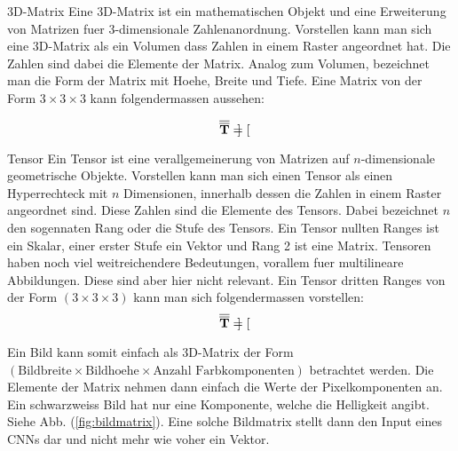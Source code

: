 \documentclass[../main]{subfiles}
\begin{document}
\begin{defbox}{3D-Matrix}
  Eine 3D-Matrix ist ein mathematischen Objekt und eine Erweiterung von Matrizen
  fuer 3-dimensionale Zahlenanordnung. Vorstellen kann man sich eine 3D-Matrix
  als ein Volumen dass Zahlen in einem Raster angeordnet hat.
  Die Zahlen sind dabei die Elemente der Matrix. Analog zum Volumen, bezeichnet
  man die Form der Matrix mit Hoehe, Breite und Tiefe.
  Eine Matrix von der Form $3 \times 3 \times 3$ kann folgendermassen aussehen:

  \begin{equation*}
    \overline{\overline{\mathbf{T}}} = \begin{bmatrix}

    \end{bmatrix}
  \end{equation*}

\end{defbox}

\begin{defbox}{Tensor}
  Ein Tensor ist eine verallgemeinerung von Matrizen auf
  $n$-dimensionale geometrische Objekte. Vorstellen kann man sich einen Tensor
  als einen Hyperrechteck mit $n$ Dimensionen, innerhalb dessen die Zahlen in
  einem Raster angeordnet sind. Diese Zahlen sind die Elemente des Tensors.
  Dabei bezeichnet $n$ den sogennaten Rang oder die Stufe des Tensors.
  Ein Tensor nullten Ranges ist ein Skalar, einer erster Stufe ein Vektor und
  Rang 2 ist eine Matrix.
  Tensoren haben noch viel weitreichendere Bedeutungen, vorallem fuer
  multilineare Abbildungen. Diese sind aber hier nicht relevant.
  \para
  Ein Tensor dritten Ranges von der Form $(3 \times 3 \times 3)$ kann man sich
  folgendermassen vorstellen:
  \begin{equation*}
    \overline{\overline{\mathbf{T}}} = \begin{bmatrix}

    \end{bmatrix}
  \end{equation*}

\end{defbox}
\para
Ein Bild kann somit einfach als 3D-Matrix der Form $(\text{Bildbreite} \times
\text{Bildhoehe} \times \text{Anzahl Farbkomponenten})$ betrachtet werden. Die
Elemente der Matrix nehmen dann einfach die Werte der Pixelkomponenten an.
Ein schwarzweiss Bild hat nur eine Komponente, welche die Helligkeit angibt.
Siehe Abb. (\ref{fig:bildmatrix}).
\para
Eine solche Bildmatrix stellt dann den Input eines CNNs dar und nicht mehr wie
voher ein Vektor.
\end{document}
